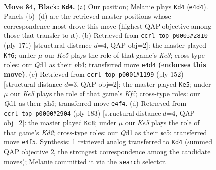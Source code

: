 \documentclass[11pt]{article}
\begin{document}
\begin{figure}[p]\centering
\begin{subfigure}{0.46\textwidth}\centering
\resizebox{\linewidth}{!}{%
\newchessgame
\chessboard[
  setfen={8/8/1p6/p7/2P1k3/8/1K6/3q4 b - - 25 84},
  showmover=false,
  pgfstyle=straightmove, color=movearrow, markmove={e4-d4}
]}
\caption{}
\end{subfigure}\hfill
\begin{subfigure}{0.46\textwidth}\centering
\resizebox{\linewidth}{!}{%
\newchessgame
\chessboard[
  setfen={8/6p1/4k1Pp/8/1P6/8/7K/8 b - - 4 86},
  showmover=false,
  pgfstyle=straightmove, color=movearrow, markmove={e6-f6}
]}
\caption{}
\end{subfigure}
\\[4pt]
\begin{subfigure}{0.46\textwidth}\centering
\resizebox{\linewidth}{!}{%
\newchessgame
\chessboard[
  setfen={8/4k3/8/p4K1p/2P5/1P6/8/8 w - - 1 77},
  showmover=false,
  pgfstyle=straightmove, color=movearrow, markmove={f5-e5}
]}
\caption{}
\end{subfigure}\hfill
\begin{subfigure}{0.46\textwidth}\centering
\resizebox{\linewidth}{!}{%
\newchessgame
\chessboard[
  setfen={8/3k4/8/2P3p1/5pP1/2K5/8/8 b - - 8 92},
  showmover=false,
  pgfstyle=straightmove, color=movearrow, markmove={d7-c8}
]}
\caption{}
\end{subfigure}
\caption{\textbf{Move 84, Black: \texttt{Kd4}.} (a) Our position; Melanie plays \texttt{Kd4} (\texttt{e4d4}). Panels (b)--(d) are the retrieved master positions whose correspondence most drove this move (highest QAP objective among those that transfer to it). (b) Retrieved from \texttt{ccrl\_top\_p0003\#2810} (ply 171) [structural distance $d$=4, QAP obj=2]: the master played \texttt{Kf6}; under $\mu$ our \emph{Ke5} plays the role of that game's \emph{Ke3}; cross-type roles: our \emph{Q}d1 as their \emph{p}b4; transferred move \texttt{e4d4} \textbf{(endorses this move)}. (c) Retrieved from \texttt{ccrl\_top\_p0001\#1199} (ply 152) [structural distance $d$=3, QAP obj=2]: the master played \texttt{Ke5}; under $\mu$ our \emph{Ke5} plays the role of that game's \emph{Kf5}; cross-type roles: our \emph{Q}d1 as their \emph{p}h5; transferred move \texttt{e4f4}. (d) Retrieved from \texttt{ccrl\_top\_p0000\#2904} (ply 183) [structural distance $d$=4, QAP obj=2]: the master played \texttt{Kc8}; under $\mu$ our \emph{Ke5} plays the role of that game's \emph{Kd2}; cross-type roles: our \emph{Q}d1 as their \emph{p}c5; transferred move \texttt{e4f5}. Synthesis: 1 retrieved analog transferred to \texttt{Kd4} (summed QAP objective 2, the strongest correspondence among the candidate moves); Melanie committed it via the \texttt{search} selector.}
\label{fig:thought-m167}
\end{figure}
\end{document}
